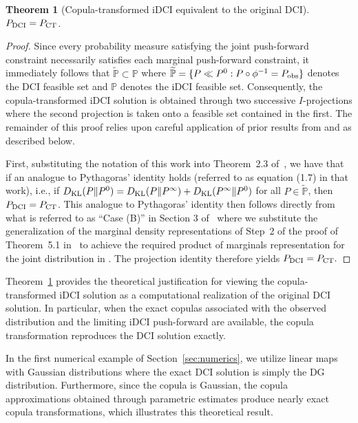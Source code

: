 \documentclass{article}
\newcounter{example}[section]
\newtheorem{theorem}{Theorem}[section]
\newcommand{\p}{\mathbb{P}}
\begin{document}
\begin{theorem}[Copula-transformed iDCI equivalent to the original DCI]\label{thm:cc_i_equals_DCI}$P_{\rm DCI} = P_{\rm CT}$.
\end{theorem}

\begin{proof}
Since every probability measure satisfying the joint push-forward constraint necessarily satisfies each marginal push-forward constraint, it immediately follows that $
\widetilde{\p}
\subset
\p$
where $\widetilde{\p}
=
\{
P \ll P^0 :
P\circ\phi^{-1}
=
P_{\rm obs}
\}$ denotes the DCI feasible set and $\p$ denotes the iDCI feasible set.
Consequently, the copula-transformed iDCI solution is obtained through two successive $I$-projections where the second projection is taken onto a feasible set contained in the first.
The remainder of this proof relies upon careful application of prior results from \cite{Csiszar1975} and \cite{JBW+26} as described below.

First, substituting the notation of this work into Theorem~2.3 of~\cite{Csiszar1975}, we have that if an analogue to Pythagoras' identity holds (referred to as equation (1.7) in that work), i.e., if $D_{\rm KL}(P \| P^0) = D_{\rm KL} (P \| P^\infty) + D_{\rm KL} (P^\infty \| P^0)$  for all $P\in \widetilde{\p}$, then $P_{\rm DCI}=P_{\rm CT}$.
This analogue to Pythagoras' identity then follows directly from what is referred to as ``Case (B)'' in Section 3 of~\cite{Csiszar1975} where we substitute the generalization of the marginal density representations of Step~2 of the proof of Theorem~5.1 in~\cite{JBW+26} to achieve the required product of marginals representation for the joint distribution in \cite{Csiszar1975}.
The projection identity therefore yields
$
P_{\rm DCI}
=
P_{\rm CT}.
$
\end{proof}

Theorem~\ref{thm:cc_i_equals_DCI} provides the theoretical justification for viewing the copula-transformed iDCI solution as a computational realization of the original DCI solution.
In particular, when the exact copulas associated with the observed distribution and the limiting iDCI push-forward are available, the copula transformation reproduces the DCI solution exactly.

In the first numerical example of Section~\ref{sec:numerics}, we utilize linear maps with Gaussian distributions where the exact DCI solution is simply the DG distribution. Furthermore, since the copula is Gaussian, the copula approximations obtained through parametric estimates produce nearly exact copula transformations, which illustrates this theoretical result.
\end{document}
